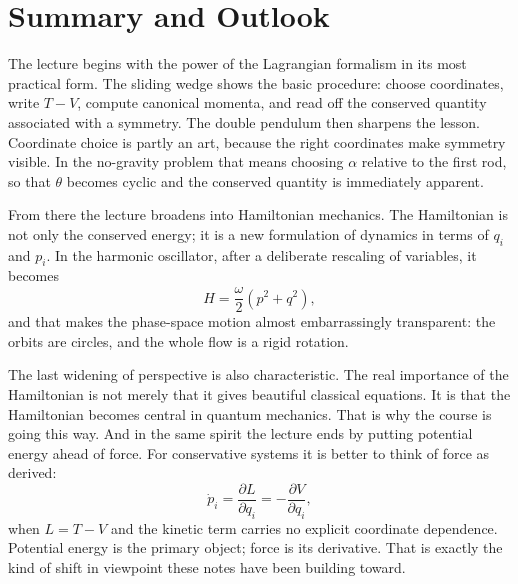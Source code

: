 \section{Summary and Outlook}

The lecture begins with the power of the Lagrangian formalism in its most practical form. The sliding wedge shows the basic procedure: choose coordinates, write \(T-V\), compute canonical momenta, and read off the conserved quantity associated with a symmetry. The double pendulum then sharpens the lesson. Coordinate choice is partly an art, because the right coordinates make symmetry visible. In the no-gravity problem that means choosing \(\alpha\) relative to the first rod, so that \(\theta\) becomes cyclic and the conserved quantity is immediately apparent.

From there the lecture broadens into Hamiltonian mechanics. The Hamiltonian is not only the conserved energy; it is a new formulation of dynamics in terms of \(q_i\) and \(p_i\). In the harmonic oscillator, after a deliberate rescaling of variables, it becomes
\begin{equation}
H=\frac{\omega}{2}(p^2+q^2),
\end{equation}
and that makes the phase-space motion almost embarrassingly transparent: the orbits are circles, and the whole flow is a rigid rotation.

The last widening of perspective is also characteristic. The real importance of the Hamiltonian is not merely that it gives beautiful classical equations. It is that the Hamiltonian becomes central in quantum mechanics. That is why the course is going this way. And in the same spirit the lecture ends by putting potential energy ahead of force. For conservative systems it is better to think of force as derived:
\begin{equation}
\dot p_i=\frac{\partial L}{\partial q_i}=-\frac{\partial V}{\partial q_i},
\end{equation}
when \(L=T-V\) and the kinetic term carries no explicit coordinate dependence. Potential energy is the primary object; force is its derivative. That is exactly the kind of shift in viewpoint these notes have been building toward.

